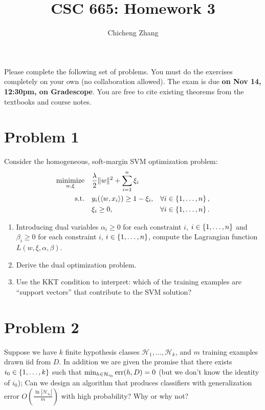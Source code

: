 \documentclass{article}
\title{CSC 665: Homework 3}
\author{Chicheng Zhang}
\DeclareMathOperator*{\err}{{\rm err}}
\DeclareMathOperator*{\minimize}{{\rm minimize}}
\DeclareMathOperator*{\st}{{\rm s.t.}}
\newcommand{\Xcal}{\mathcal{X}} %
\newcommand{\Ycal}{\mathcal{Y}} %
\newcommand{\Hcal}{\mathcal{H}} %
\newcommand{\inner}[2]{\left\langle #1,#2 \right\rangle}
\begin{document}
\maketitle

Please complete the following set of problems. You must do the exercises completely on your own (no collaboration allowed).
The exam is due \textbf{on Nov 14, 12:30pm, on Gradescope}. You are free to
cite existing theorems from the textbooks and course notes.


\section*{Problem 1}
Consider the homogeneous, soft-margin SVM optimization problem:
\begin{align}
  \minimize_{w,\xi} \quad & \frac\lambda 2 \| w \|^2 + \sum_{i=1}^n \xi_i & \label{eqn:svm-d} \\
    \st \quad & y_i(\inner{w}{x_i}) \geq 1 - \xi_i, &\forall i \in \cbr{1,\ldots,n}, \\
    & \xi_i \geq 0, &\forall i \in \cbr{1,\ldots,n}. \nonumber
\end{align}
\begin{enumerate}
\item Introducing dual variables $\alpha_i \geq 0$ for each constraint $i$, $i \in \cbr{1,\ldots,n}$ and $\beta_i \geq 0$ for each constraint $i$, $i \in \cbr{1,\ldots,n}$,
compute the Lagrangian function $L(w,\xi,\alpha,\beta)$.

\item Derive the dual optimization problem.

\item Use the KKT condition to interpret: which of the training examples are ``support vectors'' that contribute to the SVM solution?

\end{enumerate}

\section*{Problem 2}
Suppose we have $k$ finite hypothesis classes $\Hcal_1, \ldots, \Hcal_k$, and $m$ training examples drawn iid from $D$. In addition we are given the promise that there exists $i_0 \in \cbr{1,\ldots,k}$ such that $\min_{h \in \Hcal_{i_0}} \err(h, D) = 0$ (but we don't know the identity of $i_0$); Can we design an algorithm that produces classifiers with generalization error $O(\frac{\ln|\Hcal_{i_0}|}{m})$ with high probability? Why or why not?
\end{document}
